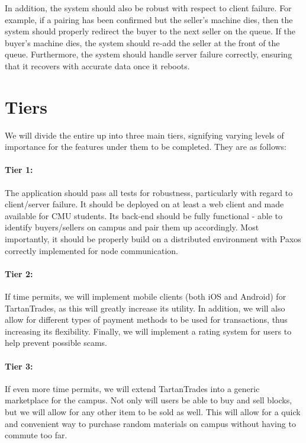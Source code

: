 \documentclass[12pt]{article}
\begin{document}
In addition, the system should also be robust with respect to client failure. For example, if a pairing has been confirmed but the seller's machine dies, then the system should properly redirect the buyer to the next seller on the queue. If the buyer's machine dies, the system should re-add the seller at the front of the queue. Furthermore, the system should handle server failure correctly, ensuring that it recovers with accurate data once it reboots.\\

\section{Tiers}

We will divide the entire up into three main tiers, signifying varying levels of importance for the features under them to be completed. They are as follows:

\paragraph{Tier 1:}
The application should pass all tests for robustness, particularly with regard to client/server failure. It should be deployed on at least a web client and made available for CMU students. Its back-end should be fully functional - able to identify buyers/sellers on campus and pair them up accordingly. Most importantly, it should be properly build on a distributed environment with Paxos correctly implemented for node communication.

\paragraph{Tier 2:}
If time permits, we will implement mobile clients (both iOS and Android) for TartanTrades, as this will greatly increase its utility. In addition, we will also allow for different types of payment methods to be used for transactions, thus increasing its flexibility. Finally, we will implement a rating system for users to help prevent possible scams.

\paragraph{Tier 3:}
If even more time permits, we will extend TartanTrades into a generic marketplace for the campus. Not only will users be able to buy and sell blocks, but we will allow for any other item to be sold as well. This will allow for a quick and convenient way to purchase random materials on campus without having to commute too far.
\end{document}
